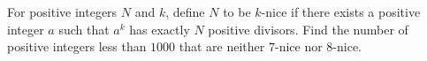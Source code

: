 For positive integers $N$ and $k$,  define $N$ to be $k$-nice if there exists a positive integer $a$ such that $a^k$ has exactly $N$ positive divisors. Find the number of positive integers less than $1000$ that are neither $7$-nice nor $8$-nice.